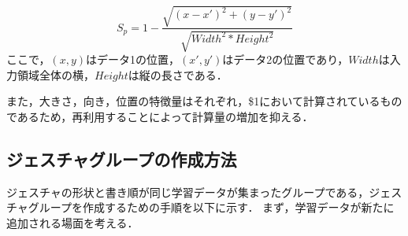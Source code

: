 \begin{equation}
S_\textit{p} = 1 - \frac{\sqrt{(x - x')^2 + (y - y')^2}}{\sqrt{W\!idt\!h^2 * H\!ei\!ght^2}}
\end{equation}
ここで，$(x, y)$はデータ1の位置，$(x', y')$はデータ2の位置であり，$Width$は入力領域全体の横，$Height$は縦の長さである．

また，大きさ，向き，位置の特徴量はそれぞれ，\$1において計算されているものであるため，再利用することによって計算量の増加を抑える．

\subsection{ジェスチャグループの作成方法}
ジェスチャの形状と書き順が同じ学習データが集まったグループである，ジェスチャグループを作成するための手順を以下に示す．
まず，学習データが新たに追加される場面を考える．
